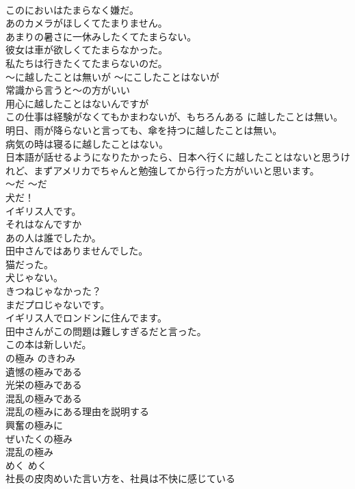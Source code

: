 \documentclass[8pt]{extreport}
\begin{document}
\begin{CJK}{UTF8}{min}
\\	このにおいはたまらなく嫌だ。  
\\	あのカメラがほしくてたまりません。  
\\	あまりの暑さに一休みしたくてたまらない。   
\\	彼女は車が欲しくてたまらなかった。   
\\	私たちは行きたくてたまらないのだ。   
\\	〜に越したことは無いが	〜にこしたことはないが	
\\	常識から言うと〜の方がいい	
\\	用心に越したことはないんですが
\\	この仕事は経験がなくてもかまわないが、もちろんある に越したことは無い。  
\\	明日、雨が降らないと言っても、傘を持つに越したことは無い。  
\\	病気の時は寝るに越したことはない。  
\\	日本語が話せるようになりたかったら、日本へ行くに越したことはないと思うけれど、まずアメリカでちゃんと勉強してから行った方がいいと思います。  
\\	〜だ	〜だ	
\\	犬だ！
\\	イギリス人です。
\\	それはなんですか 
\\	あの人は誰でしたか。 
\\	田中さんではありませんでした。
\\	猫だった。
\\	犬じゃない。
\\	きつねじゃなかった？
\\	まだプロじゃないです。
\\	イギリス人でロンドンに住んでます。
\\	田中さんがこの問題は難しすぎるだと言った。  
\\	この本は新しいだ。  
\\	の極み	のきわみ	
\\	遺憾の極みである   
\\	光栄の極みである   
\\	混乱の極みである   
\\	混乱の極みにある理由を説明する   
\\	興奮の極みに   
\\	ぜいたくの極み   
\\	混乱の極み   
\\	めく	めく	
\\	社長の皮肉めいた言い方を、社員は不快に感じている  

\end{CJK}
\end{document}
